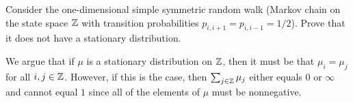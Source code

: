 \begin{problem}{4}
    Consider the one-dimensional simple symmetric random walk (Markov chain on the state space $\mathbb{Z}$ with transition probabilities $p_{i,i+1} = p_{i,i-1} = 1/2$). Prove that it does not have a stationary distribution.
\end{problem}
\begin{solution}
   We argue that if $\mu$ is a stationary distribution on $\mathbb{Z}$, then it must be that $\mu_i = \mu_j$ for all $i,j \in \mathbb{Z}$. However, if this is the case, then $\sum_{j\in\mathbb{Z}} \mu_j$ either equals $0$ or $\infty$ and cannot equal $1$ since all of the elements of $\mu$ must be nonnegative.  
\end{solution}

\begin{problem}{5}
\end{problem}
\begin{solution}

\end{solution}